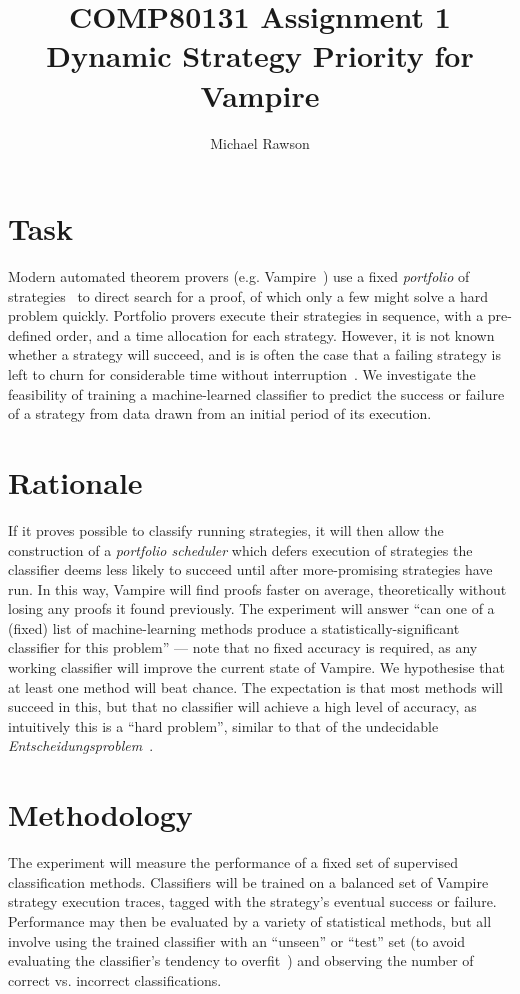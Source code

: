 \documentclass{article}
\title{COMP80131 Assignment 1\\Dynamic Strategy Priority for Vampire}
\author{Michael Rawson}
\begin{document}
\maketitle

\section{Task}
Modern automated theorem provers (e.g. Vampire~\cite{Vampire}) use a fixed \emph{portfolio} of strategies~\cite{portfolio} to direct search for a proof, of which only a few might solve a hard problem quickly.
Portfolio provers execute their strategies in sequence, with a pre-defined order, and a time allocation for each strategy.
However, it is not known whether a strategy will succeed, and is is often the case that a failing strategy is left to churn for considerable time without interruption~\cite{predict-success}.
We investigate the feasibility of training a machine-learned classifier to predict the success or failure of a strategy from data drawn from an initial period of its execution.

\section{Rationale}
If it proves possible to classify running strategies, it will then allow the construction of a \emph{portfolio scheduler} which defers execution of strategies the classifier deems less likely to succeed until after more-promising strategies have run.
In this way, Vampire will find proofs faster on average, theoretically without losing any proofs it found previously.
The experiment will answer ``can one of a (fixed) list of machine-learning methods produce a statistically-significant classifier for this problem'' --- note that no fixed accuracy is required, as any working classifier will improve the current state of Vampire.
We hypothesise that at least one method will beat chance.
The expectation is that most methods will succeed in this, but that no classifier will achieve a high level of accuracy, as intuitively this is a ``hard problem'', similar to that of the undecidable \emph{Entscheidungsproblem}~\cite{turing}.

\section{Methodology}
The experiment will measure the performance of a fixed set of supervised classification methods.
Classifiers will be trained on a balanced set of Vampire strategy execution traces, tagged with the strategy's eventual success or failure.
Performance may then be evaluated by a variety of statistical methods, but all involve using the trained classifier with an ``unseen'' or ``test'' set (to avoid evaluating the classifier's tendency to overfit~\cite{overfitting}) and observing the number of correct vs. incorrect classifications.
\end{document}
